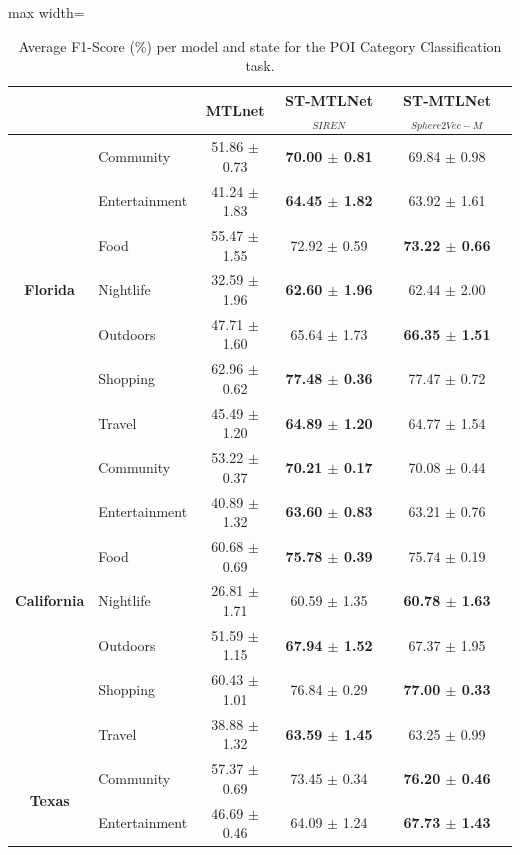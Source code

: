 \begin{table}[htbp]
\centering
\caption{Average F1-Score (\%) per model and state for the POI Category Classification task.}
\label{tab:courb:category}
\begin{adjustbox}{max width=\textwidth}
\begin{tabular}{clccc}
\toprule
 & & \textbf{MTLnet} & \textbf{ST-MTLNet$_{SIREN}$} & \textbf{ST-MTLNet$_{Sphere2Vec-M}$} \\
\midrule
\multirow{7}{*}{\textbf{Florida}} & Community & 51.86 $\pm$ 0.73 & \textbf{70.00 $\pm$ 0.81} & 69.84 $\pm$ 0.98 \\
 & Entertainment & 41.24 $\pm$ 1.83 & \textbf{64.45 $\pm$ 1.82} & 63.92 $\pm$ 1.61 \\
 & Food & 55.47 $\pm$ 1.55 & 72.92 $\pm$ 0.59 & \textbf{73.22 $\pm$ 0.66} \\
 & Nightlife & 32.59 $\pm$ 1.96 & \textbf{62.60 $\pm$ 1.96} & 62.44 $\pm$ 2.00 \\
 & Outdoors & 47.71 $\pm$ 1.60 & 65.64 $\pm$ 1.73 & \textbf{66.35 $\pm$ 1.51} \\
 & Shopping & 62.96 $\pm$ 0.62 & \textbf{77.48 $\pm$ 0.36} & 77.47 $\pm$ 0.72 \\
 & Travel & 45.49 $\pm$ 1.20 & \textbf{64.89 $\pm$ 1.20} & 64.77 $\pm$ 1.54 \\
\midrule
\multirow{7}{*}{\textbf{California}} & Community & 53.22 $\pm$ 0.37 & \textbf{70.21 $\pm$ 0.17} & 70.08 $\pm$ 0.44 \\
 & Entertainment & 40.89 $\pm$ 1.32 & \textbf{63.60 $\pm$ 0.83} & 63.21 $\pm$ 0.76 \\
 & Food & 60.68 $\pm$ 0.69 & \textbf{75.78 $\pm$ 0.39} & 75.74 $\pm$ 0.19 \\
 & Nightlife & 26.81 $\pm$ 1.71 & 60.59 $\pm$ 1.35 & \textbf{60.78 $\pm$ 1.63} \\
 & Outdoors & 51.59 $\pm$ 1.15 & \textbf{67.94 $\pm$ 1.52} & 67.37 $\pm$ 1.95 \\
 & Shopping & 60.43 $\pm$ 1.01 & 76.84 $\pm$ 0.29 & \textbf{77.00 $\pm$ 0.33} \\
 & Travel & 38.88 $\pm$ 1.32 & \textbf{63.59 $\pm$ 1.45} & 63.25 $\pm$ 0.99 \\
\midrule
\multirow{7}{*}{\textbf{Texas}} & Community & 57.37 $\pm$ 0.69 & 73.45 $\pm$ 0.34 & \textbf{76.20 $\pm$ 0.46} \\
 & Entertainment & 46.69 $\pm$ 0.46 & 64.09 $\pm$ 1.24 & \textbf{67.73 $\pm$ 1.43} \\

\end{tabular}
\end{adjustbox}
\end{table}
